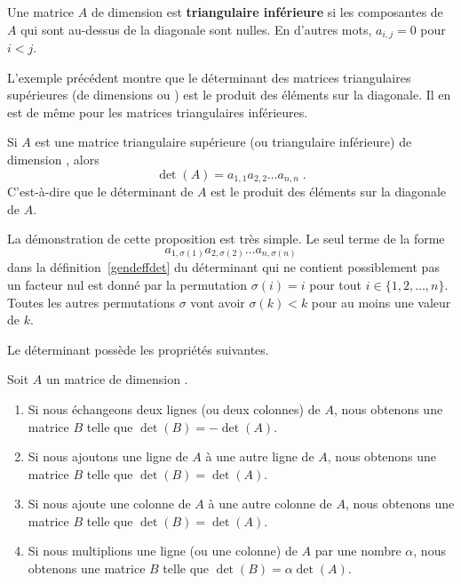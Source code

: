 {\begin{defn}
Une matrice $A$ de dimension \nn est
{\bfseries triangulaire inférieure} si les composantes de $A$ qui sont au-dessus de la
diagonale sont nulles.  En d'autres mots, $a_{i,j} =0$ pour $i<j$.
\end{defn}

L'exemple précédent montre que le déterminant des matrices
triangulaires supérieures (de dimensions  ou ) est
le produit des éléments sur la diagonale.  Il en est de même pour les
matrices triangulaires inférieures.

\begin{prop}
Si $A$ est une matrice triangulaire supérieure (ou triangulaire
inférieure) de dimension \nn, alors
\[
\det(A) = a_{1,1}a_{2,2} \ldots a_{n,n} \; .
\]
C'est-à-dire que le déterminant de $A$ est le produit des éléments sur
la diagonale de $A$.
\end{prop}

\begin{rmk}[\theory]
La démonstration de cette proposition est très simple.  Le seul terme
de la forme
\[
a_{1,\sigma(1)}a_{2,\sigma(2)} \ldots a_{n,\sigma(n)}
\]
dans la définition~\ref{gendeffdet} du déterminant qui ne contient
possiblement pas un facteur nul est donné par la permutation
$\sigma(i) = i$ pour tout $i\in \{1,2,\ldots,n\}$.  Toutes les autres
permutations $\sigma$ vont avoir $\sigma(k) < k$ pour au moins une
valeur de $k$.
\end{rmk}

Le déterminant possède les propriétés suivantes.

\begin{prop} \label{detProps}
Soit $A$ un matrice de dimension \nn.
\begin{enumerate}
\item Si nous échangeons deux lignes (ou deux colonnes) de $A$, nous obtenons
  une matrice $B$ telle que $\det(B) = - \det(A)$. 
\item Si nous ajoutons une ligne de $A$ à une autre ligne de $A$, nous
  obtenons une matrice $B$ telle que $\det(B) = \det(A)$. 
\item Si nous ajoute une colonne de $A$ à une autre colonne de $A$, nous
  obtenons une matrice $B$ telle que $\det(B) = \det(A)$.
\item Si nous multiplions une ligne (ou une colonne) de $A$ par une nombre
  $\alpha$, nous obtenons une matrice $B$ telle que
  $\det(B) = \alpha \det(A)$.
\end{enumerate}
\end{prop}

}

